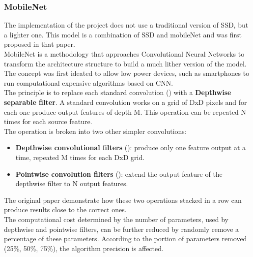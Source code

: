 \subsubsection*{MobileNet}
The implementation of the project does not use a traditional version of SSD, but a lighter one. This model is a combination of SSD and mobileNet\cite{mobilenet} and was first proposed in that paper.\\
MobileNet is a methodology that approaches Convolutional Neural Networks to transform the architecture structure to build a much lither version of the model. The concept was first ideated to allow low power devices, such as smartphones to run computational expensive algorithms based on CNN.\\
The principle is to replace each standard convolution () with a \textbf{Depthwise separable filter}. A standard convolution works on a grid of DxD pixels and for each one produce output features of depth M. This operation can be repeated N times for each source feature.\\
The operation is broken into two other simpler convolutions:
\begin{itemize}
	\item \textbf{Depthwise convolutional filters} (): produce only one feature output at a time, repeated M times for each DxD grid.
	\item \textbf{Pointwise convolution filters} (): extend the output feature of the depthwise filter to N output features.
\end{itemize}
The original paper demonstrate how these two operations stacked in a row can produce results close to the correct ones.\\
The computational cost determined by the number of parameters, used by depthwise and pointwise filters, can be further reduced by randomly remove a percentage of these parameters. According to the portion of parameters removed (25\%, 50\%, 75\%), the algorithm precision is affected.

